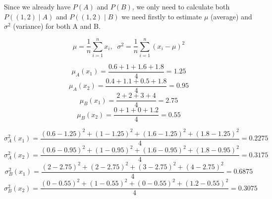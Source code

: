\documentclass{article}
\begin{document}
Since we already have \( P(A) \) and \( P(B) \), we only need to calculate both \( P((1,2) \mid A) \) and \( P((1,2) \mid B) \)
we need firstly to estimate \( \mu \) (average) and \(\sigma^2\) (variance) for both A and B.

\[
\mu = \frac{1}{n}\sum_{i = 1}^n x_i, \;\;\sigma^2 = \frac{1}{n}\sum_{i = 1}^n (x_i - \mu)^2
\]

\[
\mu_A(x_1) = \frac{0.6+1+1.6+1.8}{4} = 1.25
\]
\[
\mu_A(x_2) = \frac{0.4+1.1+0.5+1.8}{4} = 0.95
\]
\[
\mu_B(x_1) = \frac{2+2+3+4}{4} = 2.75
\]
\[
\mu_B(x_2) = \frac{0+1+0+1.2}{4} = 0.55
\]

\[
\sigma^2_A(x_1) = \frac{(0.6-1.25)^2 + (1 - 1.25)^2 + (1.6 - 1.25)^2 + (1.8 - 1.25)^2}{4} = 0.2275
\]
\[
\sigma^2_A(x_2) = \frac{(0.6-0.95)^2 + (1 - 0.95)^2 + (1.6 - 0.95)^2 + (1.8 - 0.95)^2}{4} = 0.3175
\]
\[
\sigma^2_B(x_1) = \frac{(2 - 2.75)^2 + (2 - 2.75)^2 + (3 - 2.75)^2 + (4 - 2.75)^2}{4} = 0.6875
\]
\[
\sigma^2_B(x_2) = \frac{(0 - 0.55)^2 + (1 - 0.55)^2 + (0 - 0.55)^2 + (1.2 - 0.55)^2}{4} = 0.3075
\]














\newpage
\end{document}
